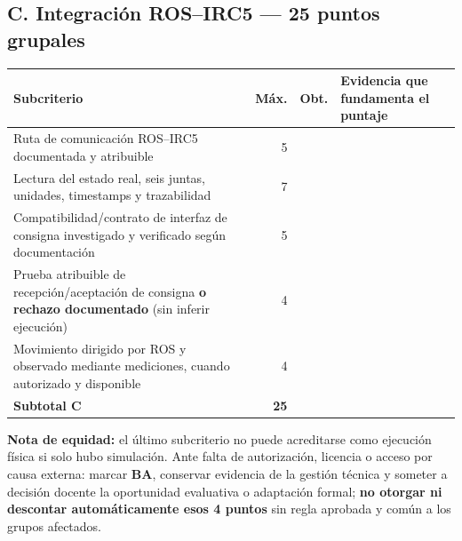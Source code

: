 \documentclass[10pt, a4paper]{article}
\begin{document}
\subsection*{C. Integración ROS–IRC5 — 25 puntos grupales}
\begingroup
\scriptsize
\setlength{\tabcolsep}{3.5pt}
\renewcommand{\arraystretch}{1.40}
\noindent\begin{tabularx}{\textwidth}{|>{\hsize=1.15\hsize\raggedright\arraybackslash}X|r|r|>{\hsize=0.85\hsize\raggedright\arraybackslash}X|}
\hline
\rowcolor{ucbblue!15}
\textbf{Subcriterio} & \textbf{Máx.} & \textbf{Obt.} & \textbf{Evidencia que fundamenta el puntaje} \\ \hline
Ruta de comunicación ROS–IRC5 documentada y atribuible & 5 & & \\ \hline
Lectura del estado real, seis juntas, unidades, timestamps y trazabilidad & 7 & & \\ \hline
Compatibilidad/contrato de interfaz de consigna investigado y verificado según documentación & 5 & & \\ \hline
Prueba atribuible de recepción/aceptación de consigna \textbf{o rechazo documentado} (sin inferir ejecución) & 4 & & \\ \hline
Movimiento dirigido por ROS y observado mediante mediciones, cuando autorizado y disponible & 4 & & \\ \hline
\rowcolor{offcolor}
\textbf{Subtotal C} & \textbf{25} & & \\ \hline
\end{tabularx}
\endgroup

{\footnotesize\textbf{Nota de equidad:} el último subcriterio no puede acreditarse como ejecución física si solo hubo simulación. Ante falta de autorización, licencia o acceso por causa externa: marcar \textbf{BA}, conservar evidencia de la gestión técnica y someter a decisión docente la oportunidad evaluativa o adaptación formal; \textbf{no otorgar ni descontar automáticamente esos 4 puntos} sin regla aprobada y común a los grupos afectados.}
\end{document}
